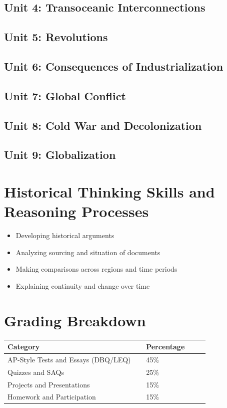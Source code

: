 \documentclass[12pt,oneside]{book}
\begin{document}
\subsection*{Unit 4: Transoceanic Interconnections}
\subsection*{Unit 5: Revolutions}
\subsection*{Unit 6: Consequences of Industrialization}
\subsection*{Unit 7: Global Conflict}
\subsection*{Unit 8: Cold War and Decolonization}
\subsection*{Unit 9: Globalization}

\section{Historical Thinking Skills and Reasoning Processes}
\begin{itemize}[leftmargin=2em]
    \item Developing historical arguments
    \item Analyzing sourcing and situation of documents
    \item Making comparisons across regions and time periods
    \item Explaining continuity and change over time
\end{itemize}

\section{Grading Breakdown}
\begin{center}
\begin{tabular}{L{0.55\linewidth}L{0.25\linewidth}}
\toprule
\textbf{Category} & \textbf{Percentage} \\
\midrule
AP-Style Tests and Essays (DBQ/LEQ) & 45\% \\
Quizzes and SAQs & 25\% \\
Projects and Presentations & 15\% \\
Homework and Participation & 15\% \\
\bottomrule
\end{tabular}
\end{center}
\end{document}
